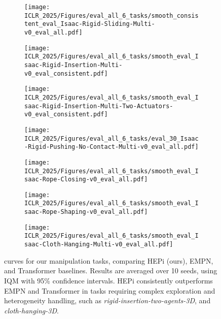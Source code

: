 \begin{figure*}[t]
    \makebox[\textwidth][c]{
    
    }
    \centering
    \begin{subfigure}[b]{0.25\linewidth}
        \texttt{[image: ICLR\_2025/Figures/eval\_all\_6\_tasks/smooth\_consistent\_eval\_Isaac-Rigid-Sliding-Multi-v0\_eval\_all.pdf]}
    \end{subfigure}%
    \begin{subfigure}[b]{0.25\linewidth}
    \texttt{[image: ICLR\_2025/Figures/eval\_all\_6\_tasks/smooth\_eval\_Isaac-Rigid-Insertion-Multi-v0\_eval\_consistent.pdf]}
    \end{subfigure}%
    \begin{subfigure}[b]{0.25\linewidth}
        \texttt{[image: ICLR\_2025/Figures/eval\_all\_6\_tasks/smooth\_eval\_Isaac-Rigid-Insertion-Multi-Two-Actuators-v0\_eval\_consistent.pdf]}
    \end{subfigure}%
    \begin{subfigure}[b]{0.25\linewidth}
        \texttt{[image: ICLR\_2025/Figures/eval\_all\_6\_tasks/eval\_30\_Isaac-Rigid-Pushing-No-Contact-Multi-v0\_eval\_all.pdf]}
    \end{subfigure}
        
    \begin{subfigure}[b]{0.25\linewidth}
        \texttt{[image: ICLR\_2025/Figures/eval\_all\_6\_tasks/smooth\_eval\_Isaac-Rope-Closing-v0\_eval\_all.pdf]}
    \end{subfigure}
    \begin{subfigure}[b]{0.25\linewidth}
        \texttt{[image: ICLR\_2025/Figures/eval\_all\_6\_tasks/smooth\_eval\_Isaac-Rope-Shaping-v0\_eval\_all.pdf]}
    \end{subfigure}
    \begin{subfigure}[b]{0.25\linewidth}
        \texttt{[image: ICLR\_2025/Figures/eval\_all\_6\_tasks/smooth\_eval\_Isaac-Cloth-Hanging-Multi-v0\_eval\_all.pdf]}
    \end{subfigure}
    
    \caption{ curves for our  manipulation tasks, comparing HEPi (ours), EMPN, and Transformer baselines. Results are averaged over 10 seeds, using IQM with 95\% confidence intervals. HEPi consistently outperforms EMPN and Transformer in tasks requiring complex exploration and heterogeneity handling, such as \textit{rigid-insertion-two-agents-3D},  and \textit{cloth-hanging-3D}.}
    \vspace{-0.2cm}
    \label{fig:results_main_6_tasks}
\end{figure*}